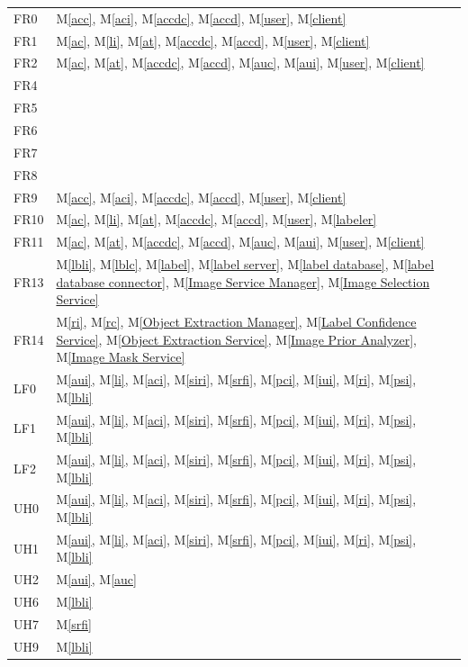 \documentclass[12pt, titlepage]{article}
\newcommand{\mref}[1]{M\ref{#1}}
\begin{document}
\begin{longtable}{p{} p{}}
FR0 & \mref{acc}, \mref{aci}, \mref{accdc}, \mref{accd}, \mref{user}, \mref{client} \\
FR1 & \mref{ac}, \mref{li}, \mref{at}, \mref{accdc}, \mref{accd}, \mref{user}, \mref{client} \\
FR2 & \mref{ac}, \mref{at}, \mref{accdc}, \mref{accd}, \mref{auc}, \mref{aui}, \mref{user}, \mref{client} \\
FR4 &  \\
FR5 &  \\
FR6 &  \\
FR7 &  \\
FR8 &  \\
FR9 & \mref{acc}, \mref{aci}, \mref{accdc}, \mref{accd}, \mref{user}, \mref{client} \\
FR10 & \mref{ac}, \mref{li}, \mref{at}, \mref{accdc}, \mref{accd}, \mref{user}, \mref{labeler} \\
FR11 & \mref{ac}, \mref{at}, \mref{accdc}, \mref{accd}, \mref{auc}, \mref{aui}, \mref{user}, \mref{client} \\
FR13 &  \mref{lbli}, \mref{lblc}, \mref{label}, \mref{label server}, \mref{label database}, \mref{label database connector}, \mref{Image Service Manager}, \mref{Image Selection Service}\\
FR14 &  \mref{ri}, \mref{rc}, \mref{Object Extraction Manager}, \mref{Label Confidence Service}, \mref{Object Extraction Service}, \mref{Image Prior Analyzer}, \mref{Image Mask Service}  \\
LF0 & \mref{aui}, \mref{li}, \mref{aci}, \mref{siri}, \mref{srfi}, \mref{pci}, \mref{iui}, \mref{ri}, \mref{psi}, \mref{lbli}\\
LF1 & \mref{aui}, \mref{li}, \mref{aci}, \mref{siri}, \mref{srfi}, \mref{pci}, \mref{iui}, \mref{ri}, \mref{psi}, \mref{lbli}\\
LF2 & \mref{aui}, \mref{li}, \mref{aci}, \mref{siri}, \mref{srfi}, \mref{pci}, \mref{iui}, \mref{ri}, \mref{psi}, \mref{lbli}\\
UH0 & \mref{aui}, \mref{li}, \mref{aci}, \mref{siri}, \mref{srfi}, \mref{pci}, \mref{iui}, \mref{ri}, \mref{psi}, \mref{lbli}\\
UH1 & \mref{aui}, \mref{li}, \mref{aci}, \mref{siri}, \mref{srfi}, \mref{pci}, \mref{iui}, \mref{ri}, \mref{psi}, \mref{lbli}\\
UH2 & \mref{aui}, \mref{auc} \\
UH6 & \mref{lbli} \\
UH7 & \mref{srfi} \\
UH9 & \mref{lbli} \\

\end{longtable}
\end{document}
